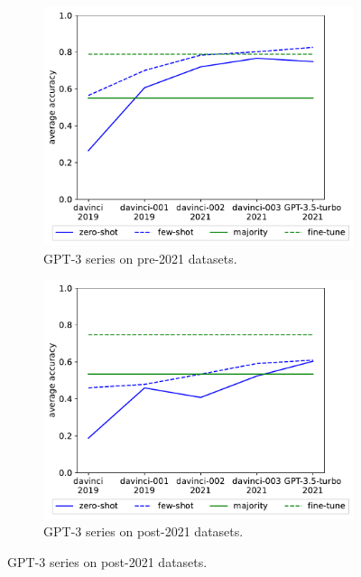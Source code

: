 \documentclass[letterpaper]{article} %
\begin{document}
\begin{figure}[t]
        \centering
        \begin{subfigure}[b]{0.475\textwidth}
            \centering
            \includegraphics[scale=0.45]{img/output-zero-few-shot-old-dataset.pdf}
            \caption[]%
            {{GPT-3 series on pre-2021 datasets.}}    
            \label{fig:GPT-old-datasets}
        \end{subfigure}
        \begin{subfigure}[b]{0.475\textwidth}   
            \centering 
            \includegraphics[scale=0.45]{img/output-zero-few-shot-new-dataset.pdf}
            \caption[]%
            {{GPT-3 series on post-2021 datasets.}}    

\end{subfigure}
\end{figure}
\end{document}
